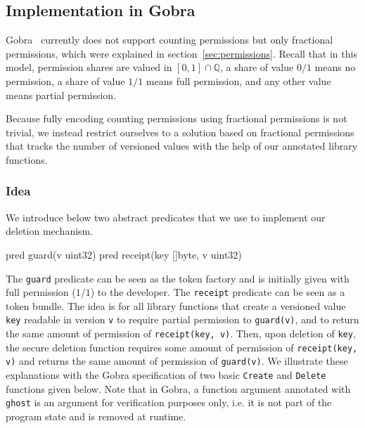 \subsection{Implementation in Gobra}
\label{sec:implementation-in-gobra}

Gobra~\cite{wolf2021gobra} currently does not support counting permissions but only fractional permissions, which were explained in section~\ref{sec:permissions}.
Recall that in this model, permission shares are valued in $[0,1]\cap\mathbb{Q}$, a share of value $0/1$ means no permission, a share of value $1/1$ means full permission, and any other value means partial permission.

Because fully encoding counting permissions using fractional permissions is not trivial, we instead restrict ourselves to a solution based on fractional permissions that tracks the number of versioned values with the help of our annotated library functions.

\subsubsection{Idea}
\label{sec:counting-permissions-idea}

We introduce below two abstract predicates that we use to implement our deletion mechanism.

\begin{gobra}
pred guard(v uint32)
pred receipt(key []byte, v uint32)
\end{gobra}

The \texttt{guard} predicate can be seen as the token factory and is initially given with full permission ($1/1$) to the developer.
The \texttt{receipt} predicate can be seen as a token bundle.
The idea is for all library functions that create a versioned value \texttt{key} readable in version \texttt{v} to require partial permission to \texttt{guard(v)}, and to return the same amount of permission of \texttt{receipt(key, v)}.
Then, upon deletion of \texttt{key}, the secure deletion function requires some amount of permission of \texttt{receipt(key, v)} and returns the same amount of permission of \texttt{guard(v)}.
We illustrate these explanations with the Gobra specification of two basic \texttt{Create} and \texttt{Delete} functions given below.
Note that in Gobra, a function argument annotated with \texttt{ghost} is an argument for verification purposes only, i.e. it is not part of the program state and is removed at runtime.

